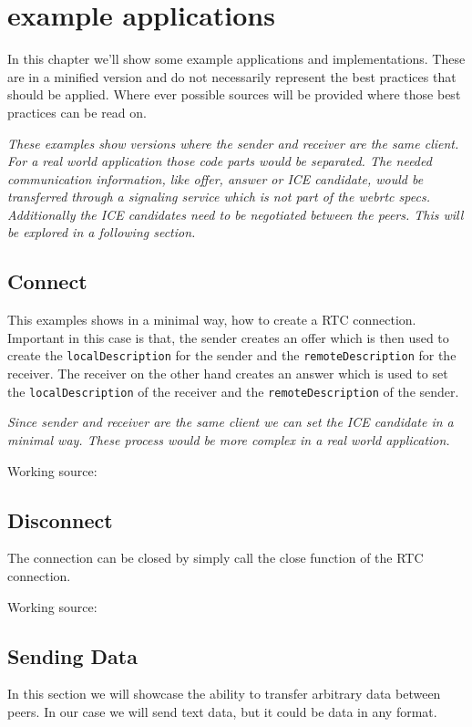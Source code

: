 \section{example applications}
In this chapter we'll show some example applications and implementations. These are in a minified version and do not necessarily represent the best practices that should be applied. Where ever possible sources will be provided where those best practices can be read on.

\textit{These examples show versions where the sender and receiver are the same client. For a real world application those code parts would be separated. The needed communication information, like offer, answer or ICE candidate, would be transferred through a signaling service which is not part of the \Gls{webrtc} specs. Additionally the ICE candidates need to be negotiated between the peers. This will be explored in a following section.}

\subsection{Connect}
This examples shows in a minimal way, how to create a RTC connection. Important in this case is that, the sender creates an offer which is then used to create the \lstinline[basicstyle=\ttfamily\color{black}]|localDescription| for the sender and the \lstinline[basicstyle=\ttfamily\color{black}]|remoteDescription| for the receiver. The receiver on the other hand creates an answer which is used to set the \lstinline[basicstyle=\ttfamily\color{black}]|localDescription| of the receiver and the \lstinline[basicstyle=\ttfamily\color{black}]|remoteDescription| of the sender.

\textit{Since sender and receiver are the same client we can set the ICE candidate in a minimal way. These process would be more complex in a real world application.}

Working source:~\autocite{webrtc:connect}

\subsection{Disconnect}
The connection can be closed by simply call the close function of the RTC connection.

Working source:~\autocite{webrtc:disconnect}

\subsection{Sending Data}
In this section we will showcase the ability to transfer arbitrary data between peers. In our case we will send text data, but it could be data in any format.

